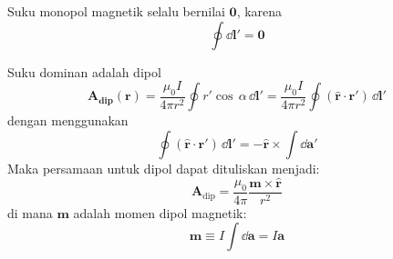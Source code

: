 \documentclass[10pt,english,twocolumn,fleqn]{extarticle}
\begin{document}
Suku monopol magnetik selalu bernilai $\mathbf{0}$, karena
\begin{equation}
\oint \dd\mathbf{l}' = \mathbf{0}
\end{equation}

Suku dominan adalah dipol
\begin{equation}
\mathbf{A}_{\mathbf{dip}}(\mathbf{r}) = \frac{\mu_0 I }{4\pi r^2} \oint r' \cos\,\alpha\,\dd\mathbf{l}'
= \frac{\mu_0 I}{4\pi r^2} \oint ( \hat{\mathbf{r}} \cdot \mathbf{r}' )\,\dd\mathbf{l}'
\end{equation}
dengan menggunakan
\begin{equation}
\oint ( \hat{\mathbf{r}} \cdot \mathbf{r}' )\,\dd\mathbf{l}' = -\hat{\mathbf{r}}\times\int\dd\mathbf{a}'
\end{equation}
Maka persamaan untuk dipol dapat dituliskan menjadi:
\begin{equation}
\mathbf{A}_{\mathrm{dip}} = \frac{\mu_0}{4\pi}\frac{\mathbf{m} \times \hat{\mathbf{r}}}{r^2}
\end{equation}
di mana $\mathbf{m}$ adalah momen dipol magnetik:
\begin{equation}
\mathbf{m} \equiv I\int\dd\mathbf{a} = I\mathbf{a}
\end{equation}
\end{document}
